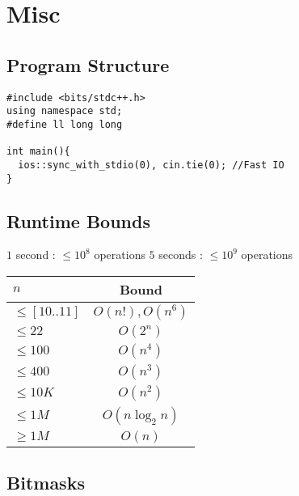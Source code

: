\documentclass[../hackpack.tex]{subfiles}
\begin{document}
    
\section{Misc}

\subsection{Program Structure}
\begin{lstlisting}
#include <bits/stdc++.h>
using namespace std;
#define ll long long

int main(){
  ios::sync_with_stdio(0), cin.tie(0); //Fast IO
}
\end{lstlisting}

\subsection{Runtime Bounds}

$1$ second : $\leq 10^8$ operations
\qquad\qquad
$5$ seconds : $\leq 10^9$ operations

\begin{flushleft}
  \label{tab:table1}
  \begin{tabular}{|l|c|} 
    \hline
    $n$ & Bound \\
    \hline
    $\leq [10..11]$ & $O(n!),O(n^6)$\\
    $\leq 22$ & $O(2^n)$\\
    $\leq 100$ & $O(n^4)$\\
    $\leq 400$ & $O(n^3)$\\
    $\leq 10K$ & $O(n^2)$\\
    $\leq 1M$ & $O(n \log_2{n})$\\
    $\geq 1M$ & $O(n)$\\
    \hline
  \end{tabular}
\end{flushleft}

\subsection{Bitmasks}
\end{document}
